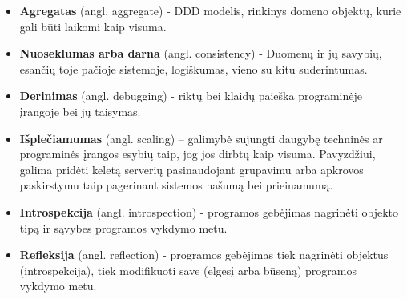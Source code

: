 \begin{itemize}

  \item \textbf{Agregatas} (angl. aggregate) - DDD modelis, rinkinys domeno objektų, kurie gali būti laikomi kaip visuma.

  \item \textbf{Nuoseklumas arba darna} (angl. consistency) - Duomenų ir jų savybių, esančių toje pačioje sistemoje, logiškumas, vieno su kitu suderintumas.

  \item \textbf{Derinimas} (angl. debugging) - riktų bei klaidų paieška programinėje įrangoje bei jų taisymas.

  \item \textbf{Išplečiamumas} (angl. scaling) – galimybė sujungti daugybę techninės ar programinės įrangos esybių taip, jog jos dirbtų kaip visuma. Pavyzdžiui, galima pridėti keletą serverių pasinaudojant grupavimu arba apkrovos paskirstymu taip pagerinant sistemos našumą bei prieinamumą.

  \item \textbf{Introspekcija} (angl. introspection) - programos gebėjimas nagrinėti objekto tipą ir sąvybes programos vykdymo metu.

  \item \textbf{Refleksija} (angl. reflection) - programos gebėjimas tiek nagrinėti objektus (introspekcija), tiek modifikuoti save (elgesį arba būseną) programos vykdymo metu.

\end{itemize}
